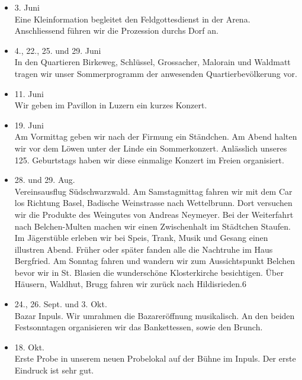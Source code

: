 \begin{history}
\begin{itemize}
        \item[]3. Juni\\
        Eine Kleinformation begleitet den Feldgottesdienst in der Arena.
        Anschliessend führen wir die Prozession durchs Dorf an.

        \item[]4., 22., 25. und 29. Juni\\
        In den Quartieren Birkeweg, Schlüssel, Grossacher, Malorain und Waldmatt
        tragen wir unser Sommerprogramm der anwesenden Quartierbevölkerung vor.

        \item[]11. Juni\\
        Wir geben im Pavillon in Luzern ein kurzes Konzert.

        \item[]19. Juni\\
        Am Vormittag geben wir nach der Firmung ein Ständchen. Am Abend halten
        wir vor dem Löwen unter der Linde ein Sommerkonzert. Anlässlich unseres
        125. Geburtstags haben wir diese einmalige Konzert im Freien
        organisiert.

        \item[]28. und 29. Aug.\\
        Vereinsausflug Südschwarzwald. Am Samstagmittag fahren wir mit dem Car
        los Richtung Basel, Badische Weinstrasse nach Wettelbrunn. Dort
        versuchen wir die Produkte des Weingutes von Andreas Neymeyer. Bei der
        Weiterfahrt nach Belchen-Multen machen wir einen Zwischenhalt im
        Städtchen Staufen. Im Jägerstüble erleben wir bei Speis, Trank, Musik
        und Gesang einen illustren Abend. Früher oder später fanden alle die
        Nachtruhe im Haus Bergfried. Am Sonntag fahren und wandern wir zum
        Aussichtspunkt Belchen bevor wir in St. Blasien die wunderschöne
        Klosterkirche besichtigen. Über Häusern, Waldhut, Brugg fahren wir
        zurück nach Hildisrieden.6

        \item[]24., 26. Sept. und 3. Okt.\\
        Bazar Inpuls. Wir umrahmen die Bazareröffnung musikalisch. An den beiden
        Festsonntagen organisieren wir das Bankettessen, sowie den Brunch.

        \item[]18. Okt.\\
        Erste Probe in unserem neuen Probelokal auf der Bühne im Inpuls. Der
        erste Eindruck ist sehr gut.


\end{itemize}
\end{history}
